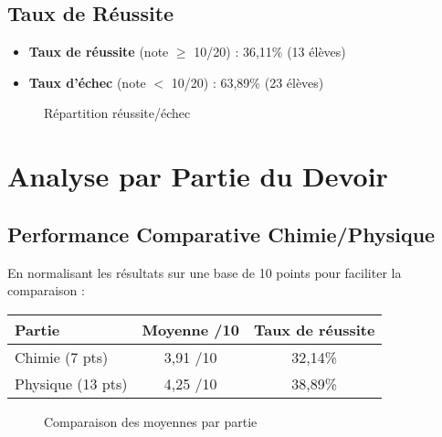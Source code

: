 \documentclass[12pt]{article}
\begin{document}
\subsection{Taux de Réussite}

\begin{itemize}
\item \textbf{Taux de réussite} (note $\geq$ 10/20) : 36,11\% (13 élèves)
\item \textbf{Taux d'échec} (note $<$ 10/20) : 63,89\% (23 élèves)
\end{itemize}

\begin{figure}[H]
\centering
{}
\caption{Répartition réussite/échec}
\end{figure}

\section{Analyse par Partie du Devoir}

\subsection{Performance Comparative Chimie/Physique}

En normalisant les résultats sur une base de 10 points pour faciliter la comparaison :

\begin{center}
\begin{tabular}{|l|c|c|}
\hline
\textbf{Partie} & \textbf{Moyenne /10} & \textbf{Taux de réussite} \\
\hline
Chimie (7 pts) & 3,91 /10 & 32,14\% \\
Physique (13 pts) & 4,25 /10 & 38,89\% \\
\hline
\end{tabular}
\end{center}

\begin{figure}[H]
\centering
{}
\caption{Comparaison des moyennes par partie}
\end{figure}
\end{document}
